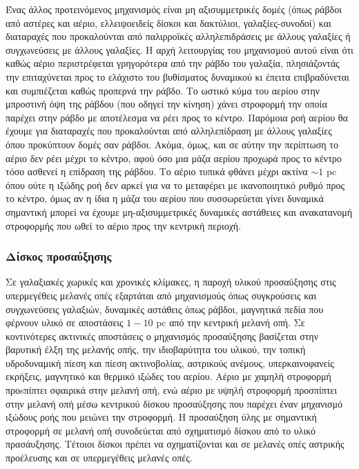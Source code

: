 Ένας άλλος προτεινόμενος μηχανισμός είναι μη αξισυμμετρικές δομές (όπως ράβδοι από αστέρες και αέριο, ελλειψοειδείς δίσκοι και δακτύλιοι, γαλαξίες-συνοδοί) και διαταραχές που προκαλούνται από παλιρροϊκές αλληλεπιδράσεις με άλλους γαλαξίες ή συγχωνεύσεις με άλλους γαλαξίες. Η αρχή λειτουργίας του μηχανισμού αυτού είναι ότι καθώς αέριο περιστρέφεται γρηγορότερα από την ράβδο του γαλαξία, πλησιάζοντάς την επιταχύνεται προς το ελάχιστο του βυθίσματος δυναμικού κι έπειτα επιβραδύνεται και συμπιέζεται καθώς προπερνά την ράβδο. Το ωστικό κύμα του αερίου στην μπροστινή όψη της ράβδου (που οδηγεί την κίνηση) χάνει στροφορμή την οποία παρέχει στην ράβδο με αποτέλεσμα να ρέει προς το κέντρο. Παρόμοια ροή αερίου θα έχουμε για διαταραχές που προκαλούνται από αλληλεπίδραση  με άλλους γαλαξίες όπου προκύπτουν δομές σαν ράβδοι. Ακόμα, όμως, και σε αύτην την περίπτωση το αέριο δεν ρέει μέχρι το κέντρο, αφού όσο μια μάζα αερίου προχωρά προς το κέντρο τόσο ασθενεί η επίδραση της ράβδου. Το αέριο τυπικά φθάνει μέχρι ακτίνα $\sim 1$ \textlatin{pc} όπου ούτε η ιξώδης ροή δεν αρκεί για να το μεταφέρει με ικανοποιητικό ρυθμό προς το κέντρο, όμως αν η ίδια η μάζα του αερίου που συσσωρεύεται γίνει δυναμικά σημαντική μπορεί να έχουμε μη-αξισυμμετρικές δυναμικές αστάθειες και ανακατανομή στροφορμής που ωθεί το αέριο προς την κεντρική περιοχή\cite{AccrPower}.    

\subsubsection*{Δίσκος προσαύξησης}

Σε γαλαξιακές χωρικές και χρονικές κλίμακες, η παροχή υλικού προσαύξησης στις υπερμεγέθεις μελανές οπές εξαρτάται από μηχανισμούς όπως συγκρούσεις και συγχωνεύσεις γαλαξιών, δυναμικές αστάθεις όπως ράβδοι, μαγνητικά πεδία που φέρνουν υλικό σε αποστάσεις $1-10$ \textlatin{pc} από την κεντρική μελανή οπή. Σε κοντινότερες ακτινικές αποστάσεις ο μηχανισμός προσαύξησης βασίζεται στην βαρυτική έλξη της μελανής οπής, την ιδιοβαρύτητα του υλικού, την τοπική υδροδυναμική πίεση και πίεση ακτινοβολίας, αστρικούς ανέμους, υπερκαινοφανείς εκρήξεις, μαγνητικό και θερμικό ιξώδες του αερίου. Αέριο με χαμηλή στροφορμή προsπίπτει σφαιρικά στην μελανή οπή, ενώ αέριο με υψηλή στροφορμή προσπίπτει στην μελανή οπή μέσω κεντρικού δίσκου προσαύξησης που παρέχει έναν μηχανισμό ιξώδους ροής που μειώνει την στροφορμή\cite{netzer_2013}.
Η προσαύξηση ύλης με σημαντική στροφορμή σε μελανή οπή συνοδεύεται από σχηματισμό δίσκου από το υλικό πρασάυξησης. Τέτοιοι δίσκοι πρέπει να σχηματίζονται και σε μελανές οπές αστρικής προέλευσης και σε υπερμεγέθεις μελανές οπές.

